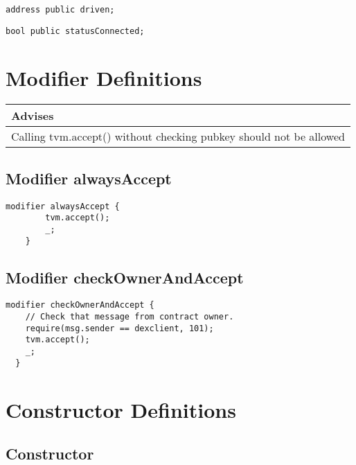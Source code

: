 \begin{lstlisting}[firstnumber=23]
  address public driven;
\end{lstlisting}

\begin{lstlisting}[firstnumber=24]
  bool public statusConnected;
\end{lstlisting}

\section{Modifier Definitions}


\ifsoldraft
\noindent\begin{tabular}{|p{12cm}|}\hline
\rowcolor{green}Advises
\\\hline
Calling tvm.accept() without checking pubkey should not be allowed
\\\hline\end{tabular}
\fi

\subsection{Modifier alwaysAccept}


\begin{lstlisting}[firstnumber=27]
	modifier alwaysAccept {
		tvm.accept();
		_;
	}
\end{lstlisting}

\subsection{Modifier checkOwnerAndAccept}


\begin{lstlisting}[firstnumber=32]
  modifier checkOwnerAndAccept {
    // Check that message from contract owner.
    require(msg.sender == dexclient, 101);
    tvm.accept();
    _;
  }
\end{lstlisting}

\section{Constructor Definitions}


\subsection{Constructor}


